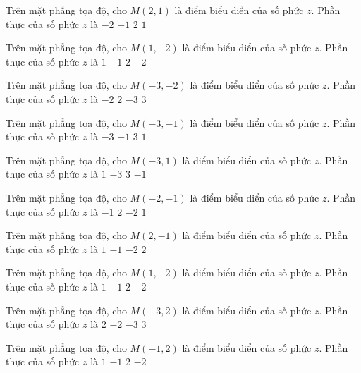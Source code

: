 \begin{ex}
 Trên mặt phẳng tọa độ, cho $M(2,1)$ là điểm biểu diển của số phức $z$. Phần thực của số phức $z$ là
\choice
{$-2$}
{$-1$}
{\True $2$}
{$1$}
\end{ex}
\begin{ex}
 Trên mặt phẳng tọa độ, cho $M(1,-2)$ là điểm biểu diển của số phức $z$. Phần thực của số phức $z$ là
\choice
{\True $1$}
{$-1$}
{$2$}
{$-2$}
\end{ex}
\begin{ex}
 Trên mặt phẳng tọa độ, cho $M(-3,-2)$ là điểm biểu diển của số phức $z$. Phần thực của số phức $z$ là
\choice
{$-2$}
{$2$}
{\True $-3$}
{$3$}
\end{ex}
\begin{ex}
 Trên mặt phẳng tọa độ, cho $M(-3,-1)$ là điểm biểu diển của số phức $z$. Phần thực của số phức $z$ là
\choice
{\True $-3$}
{$-1$}
{$3$}
{$1$}
\end{ex}
\begin{ex}
 Trên mặt phẳng tọa độ, cho $M(-3,1)$ là điểm biểu diển của số phức $z$. Phần thực của số phức $z$ là
\choice
{$1$}
{\True $-3$}
{$3$}
{$-1$}
\end{ex}
\begin{ex}
 Trên mặt phẳng tọa độ, cho $M(-2,-1)$ là điểm biểu diển của số phức $z$. Phần thực của số phức $z$ là
\choice
{$-1$}
{$2$}
{\True $-2$}
{$1$}
\end{ex}
\begin{ex}
 Trên mặt phẳng tọa độ, cho $M(2,-1)$ là điểm biểu diển của số phức $z$. Phần thực của số phức $z$ là
\choice
{$1$}
{$-1$}
{$-2$}
{\True $2$}
\end{ex}
\begin{ex}
 Trên mặt phẳng tọa độ, cho $M(1,-2)$ là điểm biểu diển của số phức $z$. Phần thực của số phức $z$ là
\choice
{\True $1$}
{$-1$}
{$2$}
{$-2$}
\end{ex}
\begin{ex}
 Trên mặt phẳng tọa độ, cho $M(-3,2)$ là điểm biểu diển của số phức $z$. Phần thực của số phức $z$ là
\choice
{$2$}
{$-2$}
{\True $-3$}
{$3$}
\end{ex}
\begin{ex}
 Trên mặt phẳng tọa độ, cho $M(-1,2)$ là điểm biểu diển của số phức $z$. Phần thực của số phức $z$ là
\choice
{$1$}
{\True $-1$}
{$2$}
{$-2$}
\end{ex}
